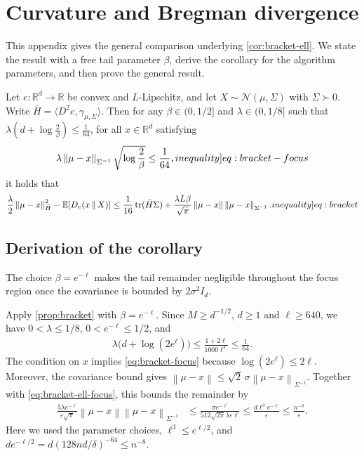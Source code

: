 \documentclass[12pt,cleveref]{jmlr}
\renewenvironment{proof}[1][\proofname]
{\par\noindent{\bfseries\upshape #1\ }}
{\jmlrQED}
\newcommand{\ineqlabel}[1]{\label[inequality]{#1}}
\newcommand{\R}{\mathbb R}
\newcommand{\E}{\mathbb E}
\newcommand{\N}{\mathcal N}
\newcommand{\tr}{\operatorname{tr}}
\newcommand{\1}{\mathbf 1}
\newcommand{\eps}{\varepsilon}
\newcommand{\norm}[1]{\left\lVert #1\right\rVert}
\newcommand{\normm}[2]{\left\lVert #1\right\rVert_{#2}}
\begin{document}
\section{Curvature and Bregman divergence}
\label{app:bracket}
This appendix gives the general comparison underlying \cref{cor:bracket-ell}.
We state the result with a free tail parameter $\beta$, derive the corollary
for the algorithm parameters, and then prove the general result.

\begin{proposition}
    \label{prop:bracket}
    Let $e:\R^d\to\R$ be convex and $L$-Lipschitz, and let
    $X\sim\N(\mu,\Sigma)$ with $\Sigma\succ0$.
    Write $\bar{H}=\langle D^2e,\gamma_{\mu,\Sigma}\rangle$.
    Then for any $\beta\in(0,1/2]$ and $\lambda\in(0, 1/8]$
    such that $\lambda\left(d+\log\frac2\beta\right) \leq \frac{1}{64}$,
    for all $x\in\R^d$ satisfying
    \begin{align}
        \lambda\normm{\mu-x}{\Sigma^{-1}}
        \sqrt{\log\frac2\beta}                \leq \frac{1}{64},
        \ineqlabel{eq:bracket-focus}
    \end{align}
    it holds that
    \begin{align}
        \frac\lambda2\normm{\mu-x}{\bar{H}}^2
        -\E[D_e(x\,\|\,X)]
        \leq
        \frac1{16}\tr(\bar{H}\Sigma)
        +\frac{\lambda L\beta}{\sqrt{\pi}}
        \norm{\mu-x}\normm{\mu-x}{\Sigma^{-1}}.
        \ineqlabel{eq:bracket}
    \end{align}
\end{proposition}

\subsection{Derivation of the corollary}
The choice $\beta=e^{-\ell}$ makes the tail remainder negligible throughout
the focus region once the covariance is bounded by $2\sigma^2I_d$.

\begin{proof}[Proof of \cref{cor:bracket-ell}]
    Apply \cref{prop:bracket} with $\beta=e^{-\ell}$.
    Since $M\geq d^{-1/2}$, $d\geq1$ and $\ell\geq640$, we have
    $0<\lambda\leq1/8$, $0<e^{-\ell}\leq1/2$, and
    \begin{align}
        \lambda\bigl(d+\log(2e^\ell)\bigr)
        \leq\frac{1+2\ell}{1000\ell^4}
        \leq\frac1{64}.
    \end{align}
    The condition on $x$ implies \cref{eq:bracket-focus} because
    $\log(2e^\ell)\leq2\ell$.
    Moreover, the covariance bound gives
    $\norm{\mu-x}\leq\sqrt2\,\sigma\normm{\mu-x}{\Sigma^{-1}}$.
    Together with \cref{eq:bracket-ell-focus}, this bounds the remainder by
    \begin{align}
        \frac{5\lambda e^{-\ell}}{\eps\sqrt\pi}
        \norm{\mu-x}\normm{\mu-x}{\Sigma^{-1}}
        & \leq\frac{\sigma e^{-\ell}}{512\sqrt{2\pi}\lambda\eps\ell}
        \leq\frac{d\ell^3e^{-\ell}}{\eps}
        \leq\frac{n^{-8}}{\eps}.
    \end{align}
    Here we used the parameter choices, $\ell^3\leq e^{\ell/2}$, and
    $de^{-\ell/2}=d(128nd/\delta)^{-64}\leq n^{-8}$.
\end{proof}
\end{document}
